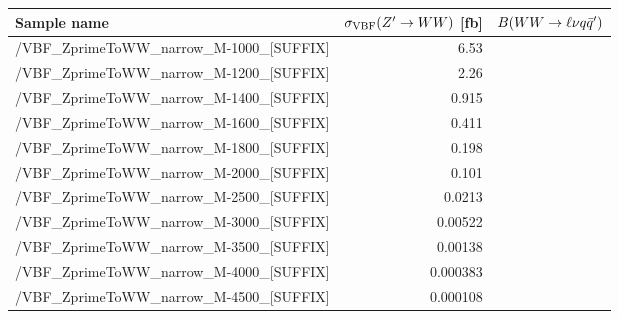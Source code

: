 \footnotesize
\begin{tabular}{lrr}
  \hline
  \textbf{Sample name} & $\sigma_{\mathrm{VBF}}(Z'\to WW)$ [fb] & $B(WW\to\ell\nu q\bar{q}')$ \\
  \hline
  \ttfamily/VBF\_ZprimeToWW\_narrow\_M-1000\_[SUFFIX] & 6.53  \\
  \ttfamily/VBF\_ZprimeToWW\_narrow\_M-1200\_[SUFFIX] & 2.26  \\
  \ttfamily/VBF\_ZprimeToWW\_narrow\_M-1400\_[SUFFIX] & 0.915  \\
  \ttfamily/VBF\_ZprimeToWW\_narrow\_M-1600\_[SUFFIX] & 0.411  \\
  \ttfamily/VBF\_ZprimeToWW\_narrow\_M-1800\_[SUFFIX] & 0.198  \\
  \ttfamily/VBF\_ZprimeToWW\_narrow\_M-2000\_[SUFFIX] & 0.101  \\
  \ttfamily/VBF\_ZprimeToWW\_narrow\_M-2500\_[SUFFIX] & 0.0213  \\
  \ttfamily/VBF\_ZprimeToWW\_narrow\_M-3000\_[SUFFIX] & 0.00522  \\
  \ttfamily/VBF\_ZprimeToWW\_narrow\_M-3500\_[SUFFIX] & 0.00138  \\
  \ttfamily/VBF\_ZprimeToWW\_narrow\_M-4000\_[SUFFIX] & 0.000383  \\
  \ttfamily/VBF\_ZprimeToWW\_narrow\_M-4500\_[SUFFIX] & 0.000108  \\
  \hline
\end{tabular}
